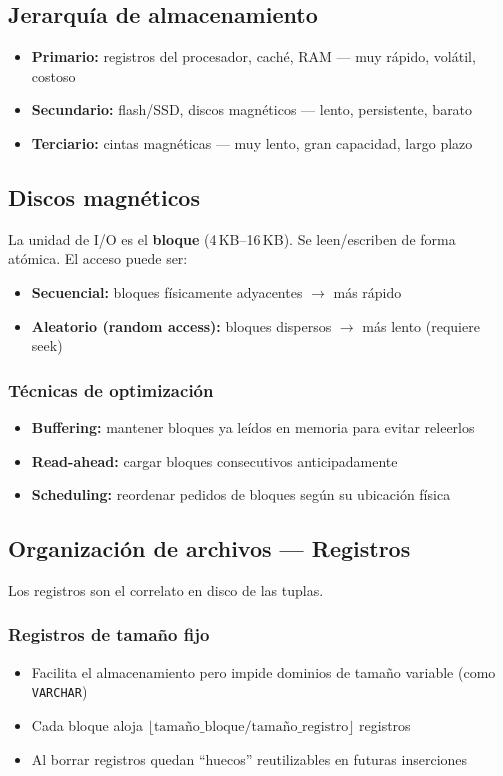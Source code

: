 \documentclass[12pt, a4paper]{article}
\begin{document}
\subsection{Jerarquía de almacenamiento}
\begin{itemize}
  \item \textbf{Primario:} registros del procesador, caché, RAM — muy rápido, volátil, costoso
  \item \textbf{Secundario:} flash/SSD, discos magnéticos — lento, persistente, barato
  \item \textbf{Terciario:} cintas magnéticas — muy lento, gran capacidad, largo plazo
\end{itemize}

\subsection{Discos magnéticos}
La unidad de I/O es el \textbf{bloque} (4\,KB--16\,KB). Se leen/escriben de forma atómica. El acceso puede ser:
\begin{itemize}
  \item \textbf{Secuencial:} bloques físicamente adyacentes $\rightarrow$ más rápido
  \item \textbf{Aleatorio (random access):} bloques dispersos $\rightarrow$ más lento (requiere seek)
\end{itemize}

\subsubsection{Técnicas de optimización}
\begin{itemize}
  \item \textbf{Buffering:} mantener bloques ya leídos en memoria para evitar releerlos
  \item \textbf{Read-ahead:} cargar bloques consecutivos anticipadamente
  \item \textbf{Scheduling:} reordenar pedidos de bloques según su ubicación física
\end{itemize}

\subsection{Organización de archivos — Registros}
Los registros son el correlato en disco de las tuplas.

\subsubsection{Registros de tamaño fijo}
\begin{itemize}
  \item Facilita el almacenamiento pero impide dominios de tamaño variable (como \texttt{VARCHAR})
  \item Cada bloque aloja $\lfloor\text{tamaño\_bloque} / \text{tamaño\_registro}\rfloor$ registros
  \item Al borrar registros quedan ``huecos'' reutilizables en futuras inserciones
\end{itemize}
\end{document}
